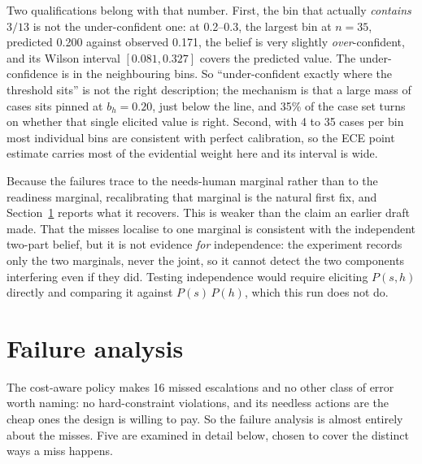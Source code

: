 \documentclass{article}
\begin{document}
Two qualifications belong with that number. First, the bin that actually
\emph{contains} $3/13$ is not the under-confident one: at 0.2--0.3, the largest bin
at $n = 35$, predicted 0.200 against observed 0.171, the belief is very slightly
\emph{over}-confident, and its Wilson interval $[0.081, 0.327]$ covers the
predicted value. The under-confidence is in the neighbouring bins. So
``under-confident exactly where the threshold sits'' is not the right description;
the mechanism is that a large mass of cases sits pinned at $b_h = 0.20$, just below
the line, and 35\% of the case set turns on whether that single elicited value is
right. Second, with 4 to 35 cases per bin most individual bins are consistent with
perfect calibration, so the ECE point estimate carries most of the evidential
weight here and its interval is wide.

Because the failures trace to the needs-human marginal rather than to the readiness
marginal, recalibrating that marginal is the natural first fix, and
Section~\ref{sec:failure} reports what it recovers. This is weaker than the claim
an earlier draft made. That the misses localise to one marginal is consistent with
the independent two-part belief, but it is not evidence \emph{for} independence: the
experiment records only the two marginals, never the joint, so it cannot detect the
two components interfering even if they did. Testing independence would require
eliciting $P(s, h)$ directly and comparing it against $P(s)\,P(h)$, which this run
does not do.
\section{Failure analysis}
\label{sec:failure}

The cost-aware policy makes 16 missed escalations and no other class of error
worth naming: no hard-constraint violations, and its needless actions are the
cheap ones the design is willing to pay. So the failure analysis is almost
entirely about the misses. Five are examined in detail below, chosen to cover the
distinct ways a miss happens.
\end{document}
